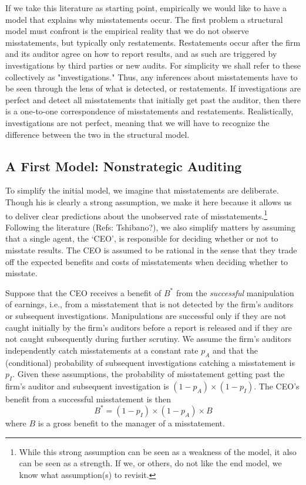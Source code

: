 If we take this literature as starting point, empirically we would like to have a model
that explains why misstatements occur. The first problem a structural model must
confront is the empirical reality that we do not observe misstatements, but typically
only restatements. Restatements occur after the firm and its auditor agree on how
to report results, and as such are triggered by investigations by third parties or new 
audits. For simplicity we shall refer to these collectively as "investigations." Thus,
any inferences about misstatements have to be seen through the lens of what is
detected, or restatements. If investigations are perfect and detect all misstatements
that initially get past the auditor, then there is a one-to-one correspondence of
misstatements and restatements. Realistically, investigations are not perfect,
meaning that we will have to recognize the difference between the two in the
structural model.

\subsection{A First Model: Nonstrategic Auditing}

To simplify the initial model, we imagine that misstatements  are
deliberate. Though his is clearly a strong assumption, we make it here because it 
allows us to deliver clear predictions about the unobserved rate of misstatements.\footnote{
While this strong assumption can be seen as a weakness of the model, it also can be
seen as a strength. If we, or others, do not like the end model, we know what assumption(s)
to revisit.} Following the literature (Refs: Tshibano?), we also simplify matters by assuming that a 
single agent, the `CEO', is responsible for deciding whether or not to misstate results.
The CEO is assumed to be rational in the sense that they trade off the expected benefits 
and costs of misstatements when deciding whether to misstate.

Suppose that the CEO receives a benefit of $B^*$ from the \emph{successful} manipulation of earnings, 
i.e., from a misstatement that is not detected by the firm's auditors or subsequent investigations. 
Manipulations are successful only if they are not caught initially by the firm's auditors before a
report is released and if they are not caught subsequently during further scrutiny. We assume
the firm's auditors independently catch misstatements at a constant rate $p_A$ 
and that the (conditional) probability of subsequent investigations catching a misstatement 
is $p_I$. Given these assumptions, the probability of misstatement getting past the firm's 
auditor and subsequent investigation is $(1-p_A) \times (1 - p_I)$.
The CEO's benefit from a successful misstatement is then
$$ B^* = (1-p_I) \times (1-p_A) \times B$$
where $B$ is a gross benefit to the manager of a misstatement. 

